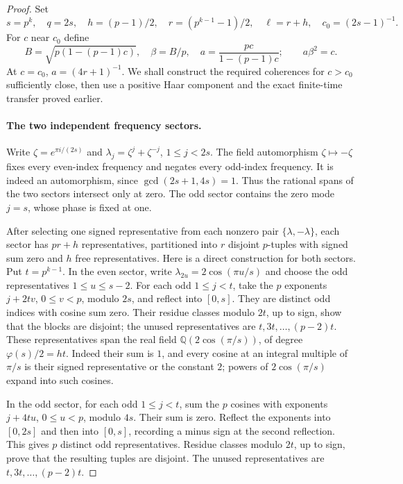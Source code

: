 \documentclass[11pt,a4paper]{article}
\theoremstyle{definition}\newtheorem{definition}[theorem]{Definition}
\theoremstyle{remark}\newtheorem{remark}[theorem]{Remark}
\begin{document}
\begin{proof}
Set
\[
 s=p^k,\quad q=2s,\quad h=(p-1)/2,\quad
 r=(p^{k-1}-1)/2,\quad \ell=r+h,\quad c_0=(2s-1)^{-1}.
\]
For $c$ near $c_0$ define
\[
 B=\sqrt{p(1-(p-1)c)},\quad \beta=B/p,\quad
 a=\frac{pc}{1-(p-1)c};\qquad a\beta^2=c.
\tag{EP1}
\]
At $c=c_0$, $a=(4r+1)^{-1}$. We shall construct the required
coherences for $c>c_0$ sufficiently close, then use a positive Haar
component and the exact finite-time transfer proved earlier.

\paragraph{The two independent frequency sectors.}
Write $\zeta=e^{\pi i/(2s)}$ and
$\lambda_j=\zeta^j+\zeta^{-j}$, $1\le j<2s$.
The field automorphism $\zeta\mapsto-\zeta$ fixes every even-index
frequency and negates every odd-index frequency. It is indeed an
automorphism, since $\gcd(2s+1,4s)=1$. Thus the rational spans of
the two sectors intersect only at zero. The odd sector contains the
zero mode $j=s$, whose phase is fixed at one.

After selecting one signed representative from each nonzero pair
$\{\lambda,-\lambda\}$, each sector has $pr+h$ representatives,
partitioned into $r$ disjoint $p$-tuples with signed sum zero and
$h$ free representatives. Here is a direct construction for both
sectors. Put $t=p^{k-1}$. In the even sector, write
$\lambda_{2u}=2\cos(\pi u/s)$ and choose the odd representatives
$1\le u\le s-2$. For each odd $1\le j<t$, take the $p$ exponents
$j+2tv$, $0\le v<p$, modulo $2s$, and reflect into $[0,s]$.
They are distinct odd indices with cosine sum zero. Their residue
classes modulo $2t$, up to sign, show that the blocks are disjoint;
the unused representatives are $t,3t,\ldots,(p-2)t$.
These representatives span the real field
$\mathbb Q(2\cos(\pi/s))$, of degree $\varphi(s)/2=ht$.
Indeed their sum is $1$, and every cosine at an integral multiple
of $\pi/s$ is their signed representative or the constant $2$;
powers of $2\cos(\pi/s)$ expand into such cosines.

In the odd sector, for each odd $1\le j<t$, sum the
$p$ cosines with exponents $j+4tu$, $0\le u<p$, modulo $4s$.
Their sum is zero. Reflect the exponents into $[0,2s]$ and then
into $[0,s]$, recording a minus sign at the second reflection.
This gives $p$ distinct odd representatives. Residue classes modulo
$2t$, up to sign, prove that the resulting tuples are disjoint.
The unused representatives are $t,3t,\ldots,(p-2)t$.


\end{proof}
\end{document}
